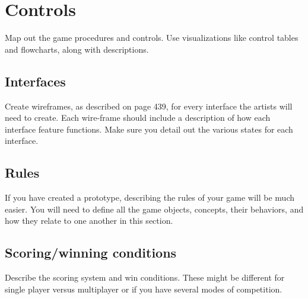 \section{Controls} %
Map out the game procedures and controls. Use visualizations like control tables
and flowcharts, along with descriptions.

\subsection{Interfaces} %
Create wireframes, as described on page 439, for every interface the artists
will need to create. Each wire-frame should include a description of how each
interface feature functions. Make sure you detail out the various states for
each interface.

\subsection{Rules} %
If you have created a prototype, describing the rules of your game will be much
easier. You will need to define all the game objects, concepts, their behaviors,
and how they relate to one another in this section.

\subsection{Scoring/winning conditions}%
Describe the scoring system and win conditions. These might be different for
single player versus multiplayer or if you have several modes of competition.